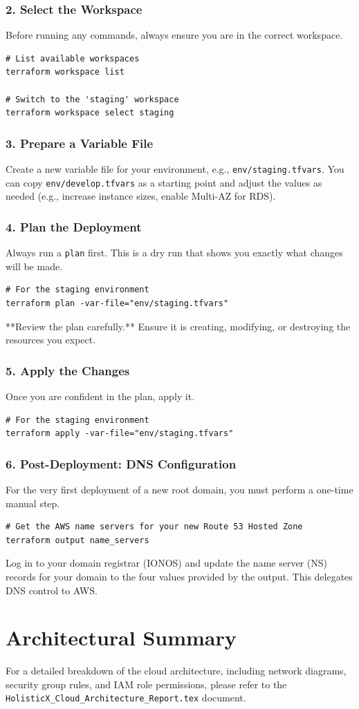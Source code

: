 \documentclass[a4paper,11pt]{article}
\begin{document}
\subsubsection{2. Select the Workspace}
Before running any commands, always ensure you are in the correct workspace.
\begin{verbatim}
# List available workspaces
terraform workspace list

# Switch to the 'staging' workspace
terraform workspace select staging
\end{verbatim}

\subsubsection{3. Prepare a Variable File}
Create a new variable file for your environment, e.g., \texttt{env/staging.tfvars}. You can copy \texttt{env/develop.tfvars} as a starting point and adjust the values as needed (e.g., increase instance sizes, enable Multi-AZ for RDS).

\subsubsection{4. Plan the Deployment}
Always run a \texttt{plan} first. This is a dry run that shows you exactly what changes will be made.
\begin{verbatim}
# For the staging environment
terraform plan -var-file="env/staging.tfvars"
\end{verbatim}
**Review the plan carefully.** Ensure it is creating, modifying, or destroying the resources you expect.

\subsubsection{5. Apply the Changes}
Once you are confident in the plan, apply it.
\begin{verbatim}
# For the staging environment
terraform apply -var-file="env/staging.tfvars"
\end{verbatim}

\subsubsection{6. Post-Deployment: DNS Configuration}
For the very first deployment of a new root domain, you must perform a one-time manual step.
\begin{verbatim}
# Get the AWS name servers for your new Route 53 Hosted Zone
terraform output name_servers
\end{verbatim}
Log in to your domain registrar (IONOS) and update the name server (NS) records for your domain to the four values provided by the output. This delegates DNS control to AWS.

\section{Architectural Summary}
For a detailed breakdown of the cloud architecture, including network diagrams, security group rules, and IAM role permissions, please refer to the \texttt{HolisticX\_Cloud\_Architecture\_Report.tex} document.
\end{document}
